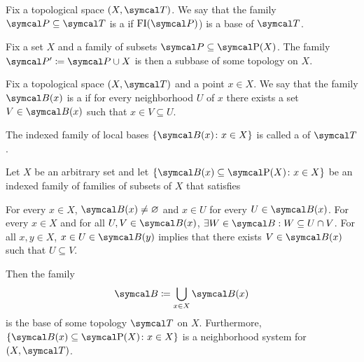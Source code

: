 \begin{definition}\label{def:topological_subbase}\cite[12]{Engelking1989}
  Fix a topological space $(X, \Cal{T})$. We say that the family $\Cal{P} \subseteq \Cal{T}$ is a  if $\FI(\Cal{P})$) is a base of $\Cal{T}$.
\end{definition}

\begin{proposition}
  Fix a set $X$ and a family of subsets $\Cal{P} \subseteq \Power(X)$. The family $\Cal{P}' \coloneqq \Cal{P} \cup X$ is then a subbase of some topology on $X$.
\end{proposition}

\begin{definition}\label{def:topological_local_base}\cite[12]{Engelking1989}
  Fix a topological space $(X, \Cal{T})$ and a point $x \in X$. We say that the family $\Cal{B}(x)$ is a  if for every neighborhood $U$ of $x$ there exists a set $V \in \Cal{B}(x)$ such that $x \in V \subseteq U$.

  The indexed family of local bases $\{ \Cal{B}(x) \colon x \in X \}$ is called a  of $\Cal{T}$.
\end{definition}

\begin{proposition}\label{thm:topological_local_base_axioms}\cite[13]{Engelking1989}
  Let $X$ be an arbitrary set and let $\{ \Cal{B}(x) \subseteq \Power(X) \colon x \in X \}$ be an indexed family of families of subsets of $X$ that satisfies
  \begin{description}
     For every $x \in X$, $\Cal{B}(x) \neq \varnothing$ and $x \in U$ for every $U \in \Cal{B}(x)$.
     For every $x \in X$ and for all $U, V \in \Cal{B}(x)$, $\exists W \in \Cal{B}: W \subseteq U \cap V$.
     For all $x, y \in X$, $x \in U \in \Cal{B}(y)$ implies that there exists $V \in \Cal{B}(x)$ such that $U \subseteq V$.
  \end{description}

  Then the family
  \begin{align*}
    \Cal{B} \coloneqq \bigcup_{x \in X} \Cal{B}(x)
  \end{align*}
  is the base of some topology $\Cal{T}$ on $X$. Furthermore, $\{ \Cal{B}(x) \subseteq \Power(X) \colon x \in X \}$ is a neighborhood system for $(X, \Cal{T})$.
\end{proposition}

